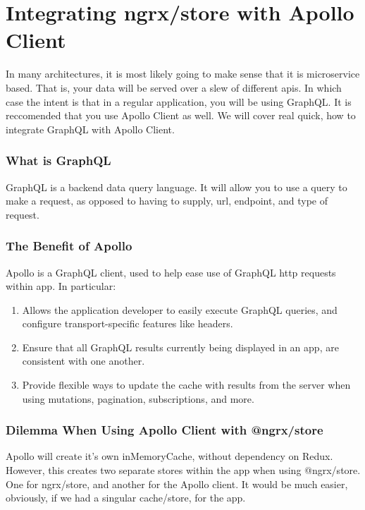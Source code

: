 \maketitle{}
\section{ Integrating ngrx/store with Apollo Client }
In many architectures, it is most likely going to make sense that it is
microservice based. That is, your data will be served over a slew of different
apis. In which case the intent is that in a regular application, you will be
using GraphQL. It is reccomended that you use Apollo Client as well. We will
cover real quick, how to integrate GraphQL with Apollo Client.

\subsubsection{ What is GraphQL }
GraphQL is a backend data query language. It will allow you to use a query to
make a request, as opposed to having to supply, url, endpoint, and type of
request.

\subsubsection{ The Benefit of Apollo }
Apollo is a GraphQL client, used to help ease use of GraphQL http requests
within app. In particular:
\begin{enumerate}
  \item Allows the application developer to easily execute GraphQL queries, and
  configure transport-specific features like headers.
  \item Ensure that all GraphQL results currently being displayed in an app, are
   consistent with one another.
  \item Provide flexible ways to update the cache with results from the server
  when using mutations, pagination, subscriptions, and more.
\end{enumerate}

\subsubsection{ Dilemma When Using Apollo Client with @ngrx/store }
Apollo will create it’s own inMemoryCache, without dependency on Redux. However,
this creates two separate stores within the app when using @ngrx/store.
One for ngrx/store, and another for the Apollo client. It would be much easier,
obviously, if we had a singular cache/store, for the app.


